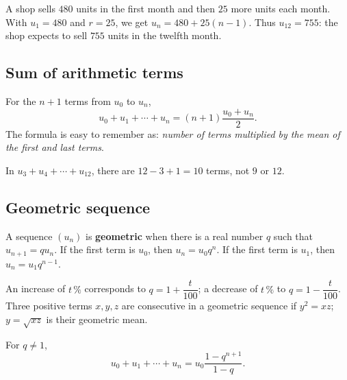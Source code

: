 \begin{exemple}
A shop sells $480$ units in the first month and then $25$ more units each month. With $u_1=480$ and $r=25$, we get $u_n=480+25(n-1)$. Thus $u_{12}=755$: the shop expects to sell $755$ units in the twelfth month.
\end{exemple}

\subsection{Sum of arithmetic terms}
For the $n+1$ terms from $u_0$ to $u_n$,
\[
u_0+u_1+\cdots+u_n=(n+1)\frac{u_0+u_n}{2}.
\]
The formula is easy to remember as: \emph{number of terms multiplied by the mean of the first and last terms}.

\begin{erreur}
In $u_3+u_4+\cdots+u_{12}$, there are $12-3+1=10$ terms, not $9$ or $12$.
\end{erreur}

\subsection{Geometric sequence}
\begin{retenir}
A sequence $(u_n)$ is \textbf{geometric} when there is a real number $q$ such that $u_{n+1}=q u_n$. If the first term is $u_0$, then $u_n=u_0q^n$. If the first term is $u_1$, then $u_n=u_1q^{n-1}$.
\end{retenir}

\begin{center}
\end{center}

An increase of $t\,\%$ corresponds to $q=1+\dfrac{t}{100}$; a decrease of $t\,\%$ to $q=1-\dfrac{t}{100}$. Three positive terms $x,y,z$ are consecutive in a geometric sequence if $y^2=xz$; $y=\sqrt{xz}$ is their geometric mean.

For $q\neq1$,
\[
u_0+u_1+\cdots+u_n=u_0\frac{1-q^{n+1}}{1-q}.
\]

